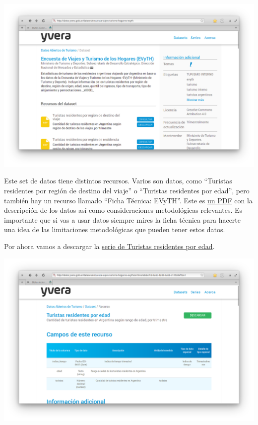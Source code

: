 \documentclass[
  openany]{book}
\begin{document}
\begin{center}\includegraphics[width=1\linewidth]{img/yvera-evyth} \end{center}

Este set de datos tiene distintos recursos.
Varios son datos, como ``Turistas residentes por región de destino del viaje'' o ``Turistas residentes por edad'', pero también hay un recurso llamado ``Ficha Técnica: EVyTH''.
Este es \href{http://datos.yvera.gob.ar/dataset/945e10f1-eee7-48a2-b0ef-8aff11df8814/resource/f41af122-ca31-4654-907b-a9cd57b80651/download/2021.01.05_evyth.pdf}{un PDF} con la descripción de los datos así como consideraciones metodológicas relevantes.
Es importante que si vas a usar datos siempre mires la ficha técnica para hacerte una idea de las limitaciones metodológicas que pueden tener estos datos.

Por ahora vamos a descargar la \href{http://datos.yvera.gob.ar/dataset/encuesta-viajes-turismo-hogares-evyth/archivo/abdacfcd-4a6c-4283-9abb-c1352def52e1}{serie de Turistas residentes por edad}.



\begin{center}\includegraphics[width=1\linewidth]{img/yvera-evyth-edad} \end{center}
\end{document}
